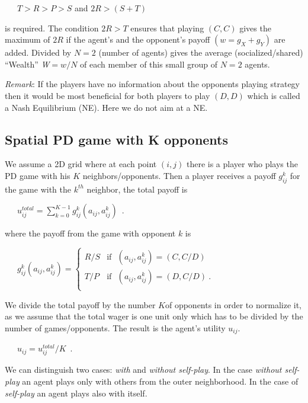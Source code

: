 \documentclass[10pt,a4paper]{article}  %
\begin{document}
~~~$T > R > P > S$ and  $2R > (S+T)$

is required. The condition $2R >T$ ensures that playing $(C, C)$ gives
the maximum of $2R$ if the agent's and the opponent's payoff $(w = g_X + g_Y)$ are added.
Divided by $N=2$ (number of agents) gives the average (socialized/shared) ``Wealth'' \textit{W}$=w/N$ of each member of this small group of $N=2$ agents.

\textit{Remark}:
If the players have no information about the opponents playing strategy
then it would be most beneficial for both players to play $(D, D)$ which is called
a Nash Equilibrium (NE). Here we do not aim at a NE.


\subsection{Spatial PD game with K opponents}

We assume a 2D grid where at each point $(i,j)$ there is a player
who plays the PD game with his $K$ neighbors/opponents. 
%
Then a player receives a payoff $g^{k}_{ij}$ for the game with the $k^{th}$ neighbor, the total payoff is 

~~~$u^{total}_{ij} = \sum_{k=0}^{K-1} g^{k}_{ij}(a_{ij},a_{ij}^k)$~.   

where the payoff from the game with  opponent $k$ is

~~~$g^{k}_{ij}(a_{ij},a_{ij}^k)=
\begin{cases}
  R/S & \text{if~ } (a_{ij}, a_{ij}^k) = (C,C/D) \\                                          
  T/P & \text{if~ } (a_{ij}, a_{ij}^k) = (D,C/D)~. \\                      
\end{cases}$


We divide the total payoff  by the number $K$of opponents in order to normalize it, as we assume that 
the total wager is one unit only which has to be divided by the number of games/opponents.
The result is the agent's utility $u_{ij}$.


~~~$u_{ij} =u^{total}_{ij} /K $~.


We can distinguish two cases: \textit{with} and \textit{without self-play}. 
In the case \textit{without self-play} an agent plays only with others from the outer neighborhood.
In the case of \textit{self-play} an agent plays also with itself.
\end{document}
